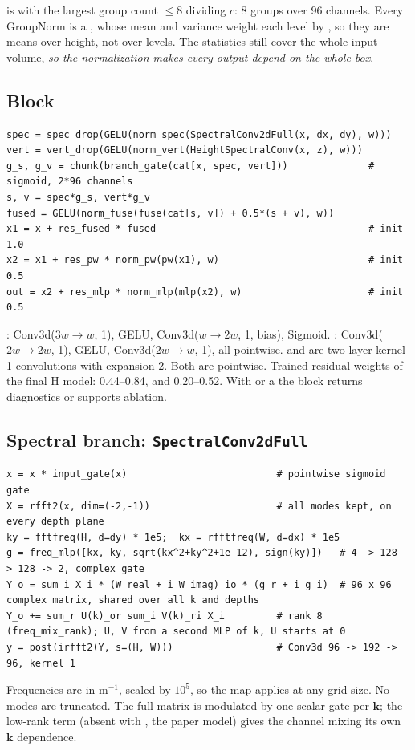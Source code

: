  is  with the largest group count $\le 8$ dividing $c$: 8 groups over 96 channels. Every GroupNorm is a , whose mean and variance weight each level by , so they are means over height, not over levels. The statistics still cover the whole input volume, \emph{so the normalization makes every output depend on the whole box}.

\subsection{Block}
\begin{lstlisting}
spec = spec_drop(GELU(norm_spec(SpectralConv2dFull(x, dx, dy), w)))
vert = vert_drop(GELU(norm_vert(HeightSpectralConv(x, z), w)))
g_s, g_v = chunk(branch_gate(cat[x, spec, vert]))              # sigmoid, 2*96 channels
s, v = spec*g_s, vert*g_v
fused = GELU(norm_fuse(fuse(cat[s, v]) + 0.5*(s + v), w))
x1 = x + res_fused * fused                                     # init 1.0
x2 = x1 + res_pw * norm_pw(pw(x1), w)                          # init 0.5
out = x2 + res_mlp * norm_mlp(mlp(x2), w)                      # init 0.5
\end{lstlisting}
: Conv3d($3w\to w$, 1), GELU, Conv3d($w\to2w$, 1, bias), Sigmoid. : Conv3d($2w\to2w$, 1), GELU, Conv3d($2w\to w$, 1), all pointwise.  and  are two-layer kernel-1 convolutions with expansion 2. Both are pointwise. Trained residual weights of the final H model:  0.44--0.84,  and  0.20--0.52. With  or a  the block returns diagnostics or supports ablation.

\subsection{Spectral branch: \texttt{SpectralConv2dFull}}
\begin{lstlisting}
x = x * input_gate(x)                          # pointwise sigmoid gate
X = rfft2(x, dim=(-2,-1))                      # all modes kept, on every depth plane
ky = fftfreq(H, d=dy) * 1e5;  kx = rfftfreq(W, d=dx) * 1e5
g = freq_mlp([kx, ky, sqrt(kx^2+ky^2+1e-12), sign(ky)])   # 4 -> 128 -> 128 -> 2, complex gate
Y_o = sum_i X_i * (W_real + i W_imag)_io * (g_r + i g_i)  # 96 x 96 complex matrix, shared over all k and depths
Y_o += sum_r U(k)_or sum_i V(k)_ri X_i         # rank 8 (freq_mix_rank); U, V from a second MLP of k, U starts at 0
y = post(irfft2(Y, s=(H, W)))                  # Conv3d 96 -> 192 -> 96, kernel 1
\end{lstlisting}
Frequencies are in m$^{-1}$, scaled by $10^5$, so the map applies at any grid size. No modes are truncated. The full matrix is modulated by one scalar gate per $\mathbf k$; the low-rank term (absent with , the paper model) gives the channel mixing its own $\mathbf k$ dependence.


